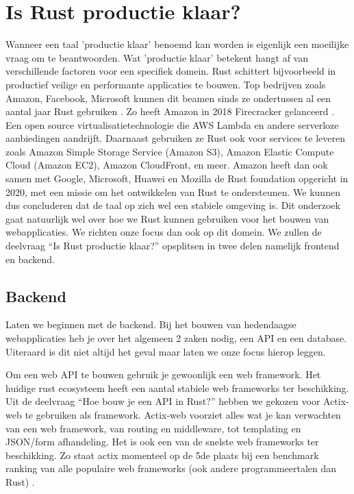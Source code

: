 \clearpage

\section{Is Rust productie klaar?}
\label{productie}

Wanneer een taal 'productie klaar' benoemd kan worden is eigenlijk een moeilijke vraag om te
beantwoorden. Wat 'productie klaar' betekent hangt af van verschillende factoren voor een specifiek
domein. Rust schittert bijvoorbeeld in productief veilige en performante applicaties te bouwen. Top
bedrijven zoals Amazon, Facebook, Microsoft kunnen dit beamen sinds ze ondertussen al een aantal jaar
Rust gebruiken \cite{rust_companies}. Zo heeft Amazon in 2018 Firecracker gelanceerd
\cite{aws_sustainability}. Een open source virtualisatietechnologie die AWS Lambda en andere
serverloze aanbiedingen aandrijft. Daarnaast gebruiken ze Rust ook voor services te leveren zoals
Amazon Simple Storage Service (Amazon S3), Amazon Elastic Compute Cloud (Amazon EC2), Amazon
CloudFront, en meer. Amazon heeft dan ook samen met Google, Microsoft, Huawei en Mozilla de Rust
foundation opgericht in 2020, met een missie om het ontwikkelen van Rust te ondersteunen. We kunnen
dus concluderen dat de taal op zich wel een stabiele omgeving is. Dit onderzoek gaat natuurlijk wel
over hoe we Rust kunnen gebruiken voor het bouwen van webapplicaties. We richten onze focus dan ook
op dit domein. We zullen de deelvraag “Is Rust productie klaar?” opsplitsen in twee delen namelijk
frontend en backend. 

\subsection{Backend }

Laten we beginnen met de backend. Bij het bouwen van hedendaagse webapplicaties heb je over het
algemeen 2 zaken nodig, een API en een database. Uiteraard is dit niet altijd het geval maar laten
we onze focus hierop leggen. 

Om een web API te bouwen gebruik je gewoonlijk een web framework. Het huidige rust ecosysteem heeft
een aantal stabiele web frameworks ter beschikking. Uit de deelvraag “Hoe bouw je een API in
Rust?” hebben we gekozen voor Actix-web te gebruiken als framework. Actix-web voorziet alles wat je
kan verwachten van een web framework, van routing en middleware, tot templating en JSON/form
afhandeling. Het is ook een van de snelste web frameworks ter beschikking. Zo staat actix momenteel
op de 5de plaats bij een benchmark ranking van alle populaire web frameworks (ook andere
programmeertalen dan Rust) \cite{web_bench}. 

